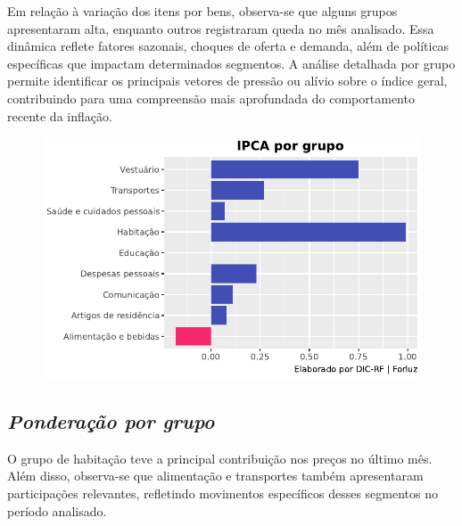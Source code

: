 \documentclass[
  letterpaper,
  DIV=11,
  numbers=noendperiod]{scrartcl}
\begin{document}
Em relação à variação dos itens por bens, observa-se que alguns grupos
apresentaram alta, enquanto outros registraram queda no mês analisado.
Essa dinâmica reflete fatores sazonais, choques de oferta e demanda,
além de políticas específicas que impactam determinados segmentos. A
análise detalhada por grupo permite identificar os principais vetores de
pressão ou alívio sobre o índice geral, contribuindo para uma
compreensão mais aprofundada do comportamento recente da inflação.

\begin{figure}

{\centering \includegraphics{Projeto IPCA Conjuntura_files/figure-pdf/cell-6-output-1.pdf}

}

\end{figure}

\hypertarget{ponderauxe7uxe3o-por-grupo}{%
\subsection{\texorpdfstring{\emph{Ponderação por
grupo}}{Ponderação por grupo}}\label{ponderauxe7uxe3o-por-grupo}}

O grupo de habitação teve a principal contribuição nos preços no último
mês. Além disso, observa-se que alimentação e transportes também
apresentaram participações relevantes, refletindo movimentos específicos
desses segmentos no período analisado.
\end{document}
